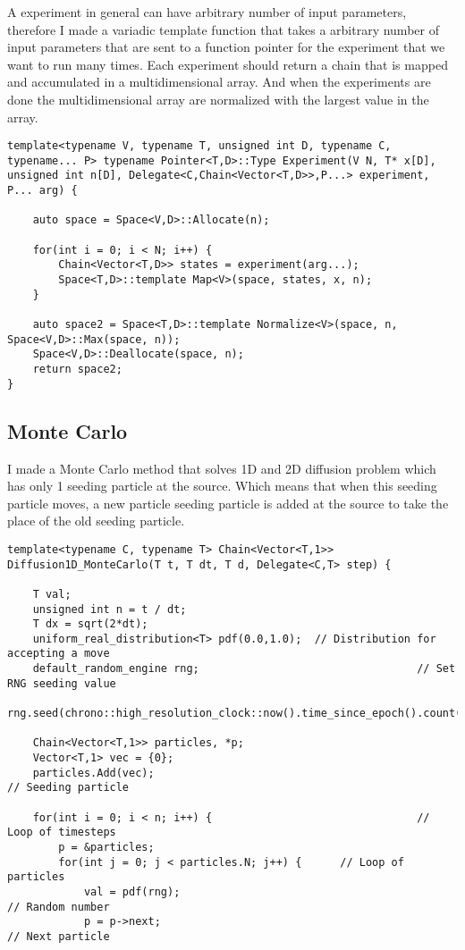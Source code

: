 \documentclass[11pt,english,a4paper]{article}
\begin{document}
\begin{flushleft}
A experiment in general can have arbitrary number of input parameters, therefore I made a variadic template function that takes a arbitrary number of input parameters that are sent to a function pointer for the experiment that we want to run many times. Each experiment should return a chain that is mapped and accumulated in a multidimensional array. And when the experiments are done the multidimensional array are normalized with the largest value in the array.

\begin{lstlisting}[title={\texttt{Experiment}}]
template<typename V, typename T, unsigned int D, typename C, typename... P> typename Pointer<T,D>::Type Experiment(V N, T* x[D], unsigned int n[D], Delegate<C,Chain<Vector<T,D>>,P...> experiment, P... arg) {

	auto space = Space<V,D>::Allocate(n);
	
	for(int i = 0; i < N; i++) {
		Chain<Vector<T,D>> states = experiment(arg...);
		Space<T,D>::template Map<V>(space, states, x, n);
	}
	
	auto space2 = Space<T,D>::template Normalize<V>(space, n, Space<V,D>::Max(space, n));
	Space<V,D>::Deallocate(space, n);
	return space2;
}
\end{lstlisting}  

\subsection{Monte Carlo}

I made a Monte Carlo method that solves 1D and 2D diffusion problem which has only 1 seeding particle at the source. Which means that when this seeding particle moves, a new particle seeding particle is added at the source to take the place of the old seeding particle.

\begin{lstlisting}[title={\texttt{Diffusion1D\_MonteCarlo}}]
template<typename C, typename T> Chain<Vector<T,1>> Diffusion1D_MonteCarlo(T t, T dt, T d, Delegate<C,T> step) {

	T val;
	unsigned int n = t / dt;
	T dx = sqrt(2*dt);
	uniform_real_distribution<T> pdf(0.0,1.0);	// Distribution for accepting a move
	default_random_engine rng;									// Set RNG seeding value
	rng.seed(chrono::high_resolution_clock::now().time_since_epoch().count());

	Chain<Vector<T,1>> particles, *p;
	Vector<T,1> vec = {0};
	particles.Add(vec);													// Seeding particle

	for(int i = 0; i < n; i++) {								// Loop of timesteps
		p = &particles;
		for(int j = 0; j < particles.N; j++) {		// Loop of particles
			val = pdf(rng);													// Random number
			p = p->next;														// Next particle
			

\end{lstlisting}
\end{flushleft}
\end{document}
